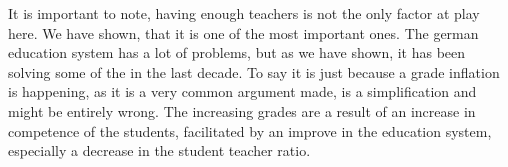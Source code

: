 It is important to note, having enough teachers is not the only factor at play here. We have shown, that it is one of the most important ones. The german education system has a lot of problems, but as we have shown, it has been solving some of the in the last decade. To say it is just because a grade inflation is happening, as it is a very common argument made, is a simplification and might be entirely wrong. The increasing grades are a result of an increase in competence of the students, facilitated by an improve in the education system, especially a decrease in the student teacher ratio.\\\\

